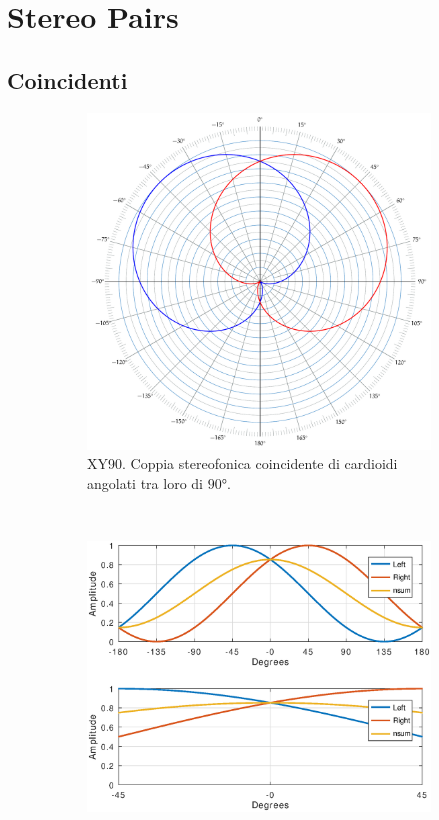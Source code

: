 \section{Stereo Pairs}

\subsection{Coincidenti}

\begin{figure}[t]
    \centering
    \begin{subfigure}[t]{0.99\textwidth}
        \centering
        \includegraphics[width=11cm]{CAPITOLI/_TIKZ/POLAR/xy90}
        \caption{XY90. Coppia stereofonica coincidente di cardioidi angolati tra loro di $90°$.}%
        \label{pol:xy90sp}
    \end{subfigure}%
    \\
    \begin{subfigure}[t]{0.99\textwidth}
        \centering
        \includegraphics[width=12.5cm]{CAPITOLI/1000/IMG/xy90sub}

\end{subfigure}
\end{figure}
